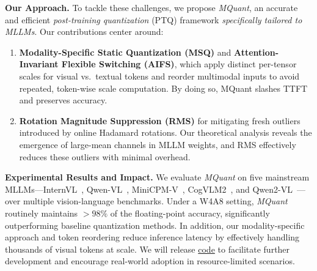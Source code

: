 \begin{table}[h]
\renewcommand\arraystretch{1.0} 
\centering
\small
\vspace{-3mm}
\caption{Ablations on the clip range for different tokens.}
\vspace{-3mm}
\label{fig:abla_visual_txt}
\setlength{\tabcolsep}{0.8mm}
\vspace{-3mm}
\end{table}

\textbf{Our Approach.} To tackle these challenges, we propose \emph{MQuant}, an accurate and efficient \emph{post-training
quantization} (PTQ) framework \emph{specifically tailored to MLLMs}. Our contributions center around:
\begin{enumerate}[leftmargin=1.2em,itemsep=2pt,parsep=1pt]
    \item \textbf{Modality-Specific Static Quantization (MSQ)} and \textbf{Attention-Invariant Flexible Switching (AIFS)},
    which apply distinct per-tensor scales for visual vs.\ textual tokens and reorder multimodal inputs to avoid repeated,
    token-wise scale computation. By doing so, MQuant slashes TTFT and preserves accuracy.

    \item \textbf{Rotation Magnitude Suppression (RMS)} for mitigating fresh outliers introduced by online Hadamard
    rotations. Our theoretical analysis reveals the emergence of large-mean channels in MLLM weights, and RMS effectively
    reduces these outliers with minimal overhead.
\end{enumerate}

\textbf{Experimental Results and Impact.} 
We evaluate \emph{MQuant} on five mainstream MLLMs---InternVL~\citep{internvl15},
Qwen-VL~\citep{qwenvl}, MiniCPM-V~\citep{yao2024minicpmv}, CogVLM2~\citep{CogVLM2}, and Qwen2-VL~\citep{Qwen2VL}---over
multiple vision-language benchmarks. Under a W4A8 setting, \emph{MQuant} routinely maintains $>98\%$ of the floating-point
accuracy, significantly outperforming baseline quantization methods. In addition, our modality-specific approach and token
reordering reduce inference latency by effectively handling thousands of visual tokens at scale. We will release 
\textcolor{red}{\href{https://github.com/StiphyJay/MQuant}{code}}
to facilitate further development and encourage real-world adoption in resource-limited scenarios.


